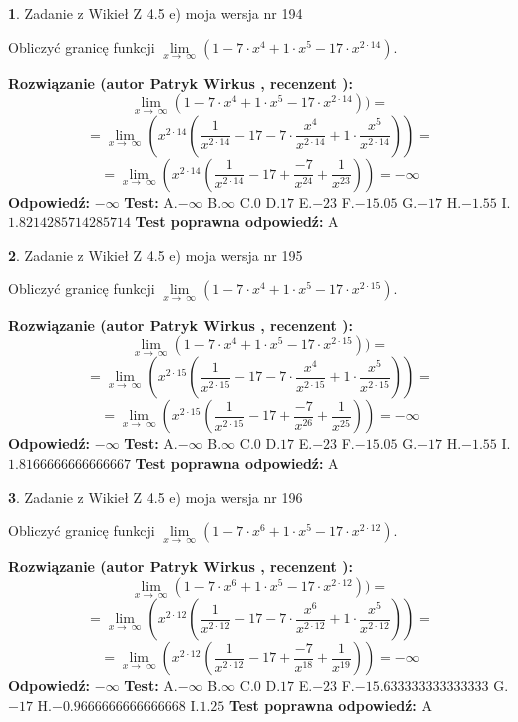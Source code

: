 \documentclass[12pt, a4paper]{article}
\theoremstyle{definition} %
\newtheorem{zad}{}
\newcommand{\zadStart}[1]{\begin{zad}#1\newline}
\newcommand{\zadStop}{\end{zad}}
\newcommand{\rozwStart}[2]{\noindent \textbf{Rozwiązanie (autor #1 , recenzent #2): }\newline}
\newcommand{\rozwStop}{\newline}
\newcommand{\odpStart}{\noindent \textbf{Odpowiedź:}\newline}
\newcommand{\odpStop}{\newline}
\newcommand{\testStart}{\noindent \textbf{Test:}\newline}
\newcommand{\testStop}{\newline}
\newcommand{\kluczStart}{\noindent \textbf{Test poprawna odpowiedź:}\newline}
\newcommand{\kluczStop}{\newline}
\begin{document}
\zadStart{Zadanie z Wikieł Z 4.5 e) moja wersja nr 194}


Obliczyć granicę funkcji  $\lim\limits_{x\to\ \infty}(1 - 7 \cdot x^{4}+1 \cdot x^{5}- 17 \cdot x^{2\cdot14})$.
\zadStop
\rozwStart{Patryk Wirkus}{}
$$\lim\limits_{x\to\ \infty}(1 - 7 \cdot x^{4}+1 \cdot x^{5}- 17 \cdot x^{2\cdot14}))=$$
$$=\lim\limits_{x\to\ \infty}(x^{2\cdot14}(\frac{1}{x^{2\cdot14}}-17 -7 \cdot \frac{x^{4}}{x^{2\cdot14}}+1 \cdot \frac{x^{5}}{x^{2\cdot14}}))=$$
$$=\lim\limits_{x\to\ \infty}(x^{2\cdot14}(\frac{1}{x^{2\cdot14}}-17 + \frac{-7}{x^{24}}+ \frac{1}{x^{23}}))=-\infty$$
\rozwStop
\odpStart
$-\infty$
\odpStop
\testStart
A.$-\infty$ B.$\infty$ C.$0$ D.$17$ E.$-23$
F.$-15.05$ G.$-17$
H.$-1.55$
I.$1.8214285714285714$
\testStop
\kluczStart
A
\kluczStop



\zadStart{Zadanie z Wikieł Z 4.5 e) moja wersja nr 195}


Obliczyć granicę funkcji  $\lim\limits_{x\to\ \infty}(1 - 7 \cdot x^{4}+1 \cdot x^{5}- 17 \cdot x^{2\cdot15})$.
\zadStop
\rozwStart{Patryk Wirkus}{}
$$\lim\limits_{x\to\ \infty}(1 - 7 \cdot x^{4}+1 \cdot x^{5}- 17 \cdot x^{2\cdot15}))=$$
$$=\lim\limits_{x\to\ \infty}(x^{2\cdot15}(\frac{1}{x^{2\cdot15}}-17 -7 \cdot \frac{x^{4}}{x^{2\cdot15}}+1 \cdot \frac{x^{5}}{x^{2\cdot15}}))=$$
$$=\lim\limits_{x\to\ \infty}(x^{2\cdot15}(\frac{1}{x^{2\cdot15}}-17 + \frac{-7}{x^{26}}+ \frac{1}{x^{25}}))=-\infty$$
\rozwStop
\odpStart
$-\infty$
\odpStop
\testStart
A.$-\infty$ B.$\infty$ C.$0$ D.$17$ E.$-23$
F.$-15.05$ G.$-17$
H.$-1.55$
I.$1.8166666666666667$
\testStop
\kluczStart
A
\kluczStop



\zadStart{Zadanie z Wikieł Z 4.5 e) moja wersja nr 196}


Obliczyć granicę funkcji  $\lim\limits_{x\to\ \infty}(1 - 7 \cdot x^{6}+1 \cdot x^{5}- 17 \cdot x^{2\cdot12})$.
\zadStop
\rozwStart{Patryk Wirkus}{}
$$\lim\limits_{x\to\ \infty}(1 - 7 \cdot x^{6}+1 \cdot x^{5}- 17 \cdot x^{2\cdot12}))=$$
$$=\lim\limits_{x\to\ \infty}(x^{2\cdot12}(\frac{1}{x^{2\cdot12}}-17 -7 \cdot \frac{x^{6}}{x^{2\cdot12}}+1 \cdot \frac{x^{5}}{x^{2\cdot12}}))=$$
$$=\lim\limits_{x\to\ \infty}(x^{2\cdot12}(\frac{1}{x^{2\cdot12}}-17 + \frac{-7}{x^{18}}+ \frac{1}{x^{19}}))=-\infty$$
\rozwStop
\odpStart
$-\infty$
\odpStop
\testStart
A.$-\infty$ B.$\infty$ C.$0$ D.$17$ E.$-23$
F.$-15.633333333333333$ G.$-17$
H.$-0.9666666666666668$
I.$1.25$
\testStop
\kluczStart
A
\kluczStop
\end{document}
